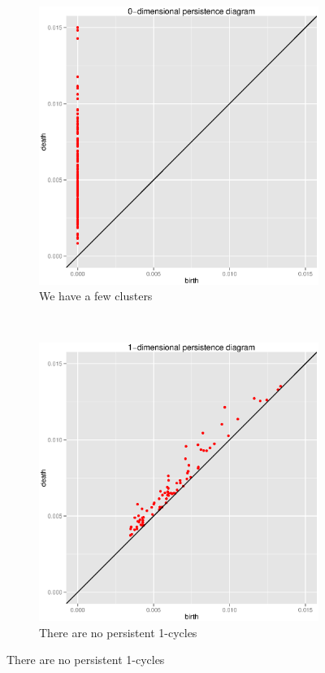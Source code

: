 \documentclass{article}
\begin{document}
\begin{figure}
\centering
\begin{subfigure}[htbp]{0.45 \textwidth}
\includegraphics[width = \linewidth]{globplots/rlr-200-0-f15e-3}
\caption{We have a few clusters}
\label{lr0}
\end{subfigure}
~
\begin{subfigure}[htbp]{0.45 \textwidth}
\includegraphics[width = \linewidth]{globplots/rlr-200-1-f15e-3}
\caption{There are no persistent 1-cycles}
\label{lr1}
\end{subfigure}
\label{lr}
\end{figure}
\end{document}
